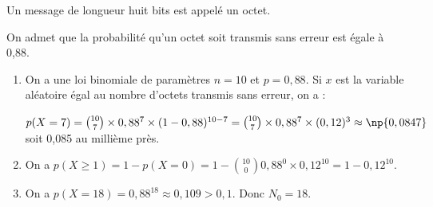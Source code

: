 Un message de longueur huit bits est appelé un octet.

On admet que la probabilité qu'un octet soit transmis sans erreur est égale à 0,88.

\begin{enumerate}[resume]
\item %


On a une loi binomiale de paramètres $n = 10$ et $p = 0,88$. Si $x$ est la variable aléatoire égal au nombre d'octets transmis sans erreur, on a :

$p(X = 7) = \binom{10}{7}\times 0,88^7 \times (1 - 0,88)^{10-7} = \binom{10}{7}\times 0,88^7 \times (0,12)^{3} \approx \np{0,0847}$ soit 0,085 au millième près.
\item %


On a $p(X \geqslant 1) = 1 - p(X = 0) = 1 - \binom{10}{0}0,88^{0} \times 0,12^{10} = 1 - 0,12^{10}$.
\item %



On a $p(X = 18) = 0,88^{18} \approx 0,109 > 0,1$. Donc $N_0 = 18$.
\end{enumerate}


